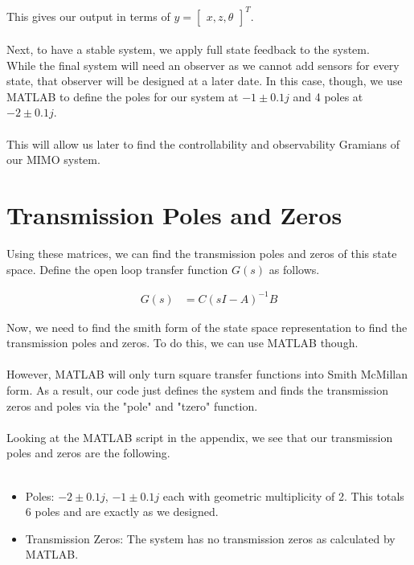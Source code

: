 \documentclass{article}
\begin{document}
    This gives our output in terms of $y = \begin{bmatrix} x, z, \theta \end{bmatrix}^T$.\\
    \\
    Next, to have a stable system, we apply full state feedback to the system.\\
    While the final system will need an observer as we cannot add sensors for every state, that observer will be designed at a later date.
    In this case, though, we use MATLAB to define the poles for our system at $-1 \pm 0.1j$ and 4 poles at $-2 \pm 0.1j$.\\
    \\
    This will allow us later to find the controllability and observability Gramians of our MIMO system.

    \section{Transmission Poles and Zeros}\label{sec:tzeros_and_poles}
    Using these matrices, we can find the transmission poles and zeros of this state space.
    Define the open loop transfer function $G(s)$ as follows.

    \begin{align}
        G(s) &= C(sI-A)^{-1}B
    \end{align}

    Now, we need to find the smith form of the state space representation to find the transmission poles and zeros.
    To do this, we can use MATLAB though.\\
    \\
    However, MATLAB will only turn square transfer functions into Smith McMillan form.
    As a result, our code just defines the system and finds the transmission zeros and poles via the "pole" and "tzero" function.\\
    \\
    Looking at the MATLAB script in the appendix, we see that our transmission poles and zeros are the following.\\
    \\
    \begin{itemize}
        \item Poles: $-2 \pm 0.1j$, $-1 \pm 0.1j$ each with geometric multiplicity of 2.
        This totals 6 poles and are exactly as we designed.
        \item Transmission Zeros: The system has no transmission zeros as calculated by MATLAB.
    \end{itemize}
\end{document}
